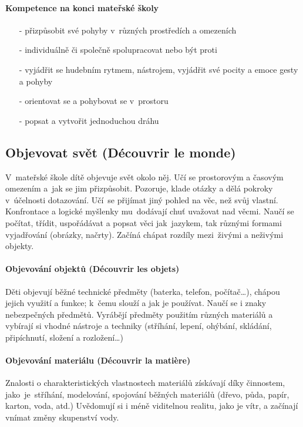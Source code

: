				\paragraph{Kompetence na konci mateřské školy}

				\begin{itemize}
					\setlength\itemsep{-2mm}
					\item[-] přizpůsobit své pohyby v různých prostředích a omezeních
					\item[-] individuálně či společně spolupracovat nebo být proti
					\item[-] vyjádřit se hudebním rytmem, nástrojem, vyjádřit své pocity a emoce gesty a pohyby
					\item[-] orientovat se a pohybovat se v prostoru
					\item[-] popsat a vytvořit jednoduchou dráhu
				\end{itemize}

		\subsection{Objevovat svět (Découvrir le monde)}
			V mateřské škole dítě objevuje svět okolo něj. Učí se prostorovým a časovým omezením a jak se jim přizpůsobit. Pozoruje, klade otázky a dělá pokroky v účelnosti dotazování. Učí se přijímat jiný pohled na věc, než svůj vlastní.  Konfrontace a logické myšlenky mu dodávají chuť uvažovat nad věcmi. Naučí se počítat, třídit, uspořádávat a popsat věci jak jazykem, tak různými formami vyjadřování (obrázky, načrty). Začíná chápat rozdíly mezi živými a neživými objekty.

			\paragraph{Objevování objektů (Découvrir les objets)}
				Děti objevují běžné technické předměty (baterka, telefon, počítač…), chápou jejich využití a funkce; k čemu slouží a jak je používat. Naučí se i znaky nebezpečných předmětů.
				Vyrábějí předměty použitím různých materiálů a vybírají si vhodné nástroje a techniky (stříhání, lepení, ohýbání, skládání, připíchnutí, složení a rozložení…)
			\paragraph{Objevování materiálu (Découvrir la matière)}
				Znalosti o charakteristických vlastnostech materiálů získávají díky činnostem, jako je stříhání, modelování, spojování běžných materiálů (dřevo, půda, papír, karton, voda, atd.)
				Uvědomují si i méně viditelnou realitu, jako je vítr, a začínají vnímat změny skupenství vody. 
